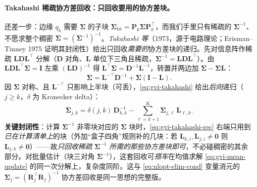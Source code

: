 \paragraph{Takahashi 稀疏协方差回收：只回收要用的协方差块。}
还差一步：边缘 $q_k$ 需要 $\boldsymbol{\Sigma}$ 的子块 $\boldsymbol{\Sigma}_{kk}=\mathbf{P}_k\boldsymbol{\Sigma}\mathbf{P}_k^\top$，而我们手里只有稀疏的 $\boldsymbol{\Sigma}^{-1}$、不愿求整个稠密 $\boldsymbol{\Sigma}=(\boldsymbol{\Sigma}^{-1})^{-1}$。\emph{Takahashi 等}（1973，源于电路理论；Erisman--Tinney 1975 证明其封闭性）给出只回收\emph{需要的}协方差块的递归。先对信息阵作稀疏 $\mathbf{L}\mathbf{D}\mathbf{L}^\top$ 分解（$\mathbf{D}$ 对角、$\mathbf{L}$ 单位下三角且稀疏，$\boldsymbol{\Sigma}^{-1}=\mathbf{L}\mathbf{D}\mathbf{L}^\top$）。由 $\mathbf{L}\mathbf{D}\mathbf{L}^\top\boldsymbol{\Sigma}=\mathbf{I}$ 左乘 $(\mathbf{L}\mathbf{D})^{-1}$ 得 $\mathbf{L}^\top\boldsymbol{\Sigma}=\mathbf{D}^{-1}\mathbf{L}^{-1}$，转置并两边加 $\boldsymbol{\Sigma}-\boldsymbol{\Sigma}\mathbf{L}$：
\begin{equation}
  \boldsymbol{\Sigma}=\mathbf{L}^{-\top}\mathbf{D}^{-1}+\boldsymbol{\Sigma}(\mathbf{I}-\mathbf{L}).
  \label{eq:gvi-takahashi}
\end{equation}
因 $\boldsymbol{\Sigma}$ 对称、且 $\mathbf{L}^{-\top}$ 只影响上半块（可丢），\cref{eq:gvi-takahashi} 给出\emph{后向}递归（$j\ge k$，$\delta$ 为 Kronecker delta）：
\begin{equation}
  \boldsymbol{\Sigma}_{j,k}=\delta(j,k)\,\mathbf{D}_{k,k}^{-1}-\sum_{\ell=k+1}^{K}\boldsymbol{\Sigma}_{j,\ell}\,\mathbf{L}_{\ell,k}.
  \label{eq:gvi-takahashi-rec}
\end{equation}
\textbf{关键封闭性}：计算 $\boldsymbol{\Sigma}^{-1}$ 非零块对应的 $\boldsymbol{\Sigma}$ 块时，\cref{eq:gvi-takahashi-rec} 右端只用到\emph{已在计算清单上}的块（外加“盒子四角”规则补的几块：若 $\mathbf{L}_{k,i},\mathbf{L}_{j,i}\ne\mathbf{0}$ 则 $\mathbf{L}_{j,k}\ne\mathbf{0}$）——故\emph{只回收稀疏 $\boldsymbol{\Sigma}^{-1}$ 所需的那些协方差块即可}，不必碰稠密的其余部分。对批量估计（块三对角 $\boldsymbol{\Sigma}^{-1}$），这套回收可\emph{搭车}在均值求解 \cref{eq:gvi-mean-update} 的同一次分解上，复杂度同阶。这与 \cref{eq:nlopt-elim-cond} 变量消元的 $\boldsymbol{\Sigma}_j=(\mathbf{R}_j^\top\mathbf{R}_j)^{-1}$ 协方差回收是同一思想的完整版。

